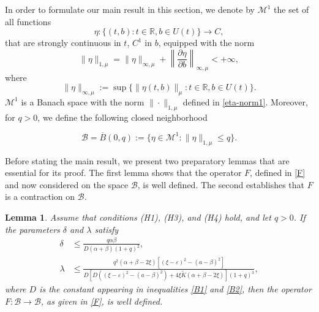 \documentclass[9pt]{amsart}
\newtheorem{lemma}{Lemma}
\numberwithin{equation}{section}
\numberwithin{lemma}{section}
\begin{document}
In order to formulate our main result in this section, we denote by $\mathcal{M}^1$ the set of all functions
\begin{equation*}
   \eta\colon\{(t,b) : t\in\mathbb{R}, b\in U(t)\}\to C, 
\end{equation*}
that are strongly continuous in $t$, $C^1$ in $b$, equipped with the norm
\begin{equation}\label{eta-norm1}
    \|\eta\|_{1,\mu} = \|\eta\|_{\infty,\mu} + \left\|\frac{\partial \eta}{\partial b}\right\|_{\infty,\mu}<+\infty,
\end{equation}
where
\begin{equation*}
    \|\eta\|_{\infty,\mu}:=\sup\{\|\eta(t,b)\|_{\mu} : t\in\mathbb{R}, b\in U(t)\}.
\end{equation*}
 $\mathcal{M}^1$ is a Banach space with the norm $\|\cdot\|_{1,\mu}$ defined in  \eqref{eta-norm1}. Moreover, for $q>0$, we define  the following closed neighborhood

 \begin{equation*}
     \mathcal{B}=\overline{B}(0,q):=\{\eta\in\mathcal{M}^1 : \|\eta\|_{1,\mu}\leq q\}.
 \end{equation*}

Before stating the main result, we present two preparatory lemmas that are essential for its proof. The first lemma shows that the operator \(F\), defined in \eqref{F} and now considered on the space \(\mathcal{B}\), is well defined. The second establishes that \(F\) is a contraction on \(\mathcal{B}\).


\begin{lemma}\label{well defined}
     Assume that conditions \textnormal{(H1)}, \textnormal{(H3)}, and \textnormal{(H4)} hold, and let \(q > 0\). If the parameters \(\delta\) and \(\lambda\) satisfy
\begin{align}
\delta &\leq \frac{q\alpha\beta}{D(\alpha+\beta)(1+q)^2}, \label{ineq-delta} \\
\lambda &\leq \frac{q^2(\alpha+\beta - 2\xi)\left[(\xi - \varepsilon)^2 - (a - \beta)^2\right]}{D\left[D\left((\xi - \varepsilon)^2 - (a - \beta)^2\right) + 4\xi\tilde{K}(\alpha + \beta - 2\xi)\right](1 + q)^3}, \label{ineq-lambda}
\end{align}
where \(D\) is the constant appearing in inequalities \eqref{B1} and \eqref{B2}, then the operator \(F \colon \mathcal{B} \to \mathcal{B}\), as given in \eqref{F}, is well defined.
\end{lemma}
\end{document}
